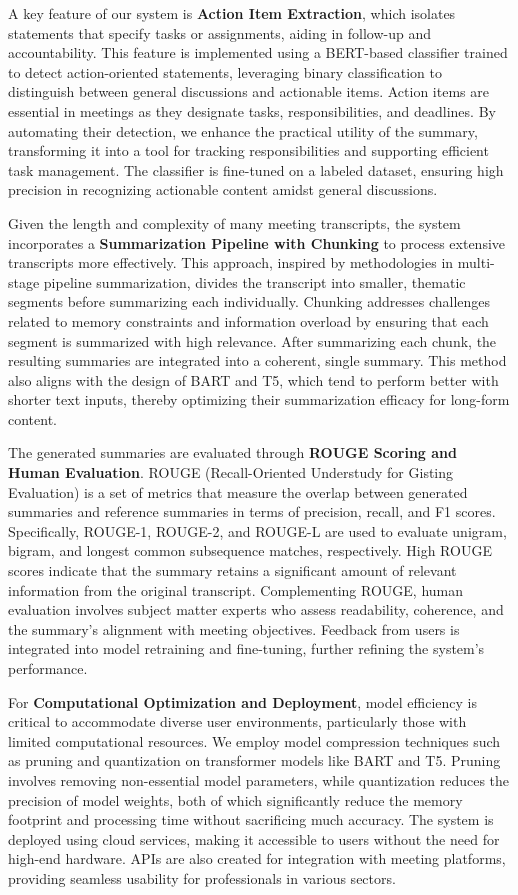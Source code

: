 \documentclass{article}
\begin{document}
A key feature of our system is \textbf{Action Item Extraction}, which isolates statements that specify tasks or assignments, aiding in follow-up and accountability. This feature is implemented using a BERT-based classifier trained to detect action-oriented statements, leveraging binary classification to distinguish between general discussions and actionable items. Action items are essential in meetings as they designate tasks, responsibilities, and deadlines. By automating their detection, we enhance the practical utility of the summary, transforming it into a tool for tracking responsibilities and supporting efficient task management. The classifier is fine-tuned on a labeled dataset, ensuring high precision in recognizing actionable content amidst general discussions.

Given the length and complexity of many meeting transcripts, the system incorporates a \textbf{Summarization Pipeline with Chunking} to process extensive transcripts more effectively. This approach, inspired by methodologies in multi-stage pipeline summarization, divides the transcript into smaller, thematic segments before summarizing each individually. Chunking addresses challenges related to memory constraints and information overload by ensuring that each segment is summarized with high relevance. After summarizing each chunk, the resulting summaries are integrated into a coherent, single summary. This method also aligns with the design of BART and T5, which tend to perform better with shorter text inputs, thereby optimizing their summarization efficacy for long-form content.

The generated summaries are evaluated through \textbf{ROUGE Scoring and Human Evaluation}. ROUGE (Recall-Oriented Understudy for Gisting Evaluation) is a set of metrics that measure the overlap between generated summaries and reference summaries in terms of precision, recall, and F1 scores. Specifically, ROUGE-1, ROUGE-2, and ROUGE-L are used to evaluate unigram, bigram, and longest common subsequence matches, respectively. High ROUGE scores indicate that the summary retains a significant amount of relevant information from the original transcript. Complementing ROUGE, human evaluation involves subject matter experts who assess readability, coherence, and the summary’s alignment with meeting objectives. Feedback from users is integrated into model retraining and fine-tuning, further refining the system’s performance.

For \textbf{Computational Optimization and Deployment}, model efficiency is critical to accommodate diverse user environments, particularly those with limited computational resources. We employ model compression techniques such as pruning and quantization on transformer models like BART and T5. Pruning involves removing non-essential model parameters, while quantization reduces the precision of model weights, both of which significantly reduce the memory footprint and processing time without sacrificing much accuracy. The system is deployed using cloud services, making it accessible to users without the need for high-end hardware. APIs are also created for integration with meeting platforms, providing seamless usability for professionals in various sectors.
\end{document}
